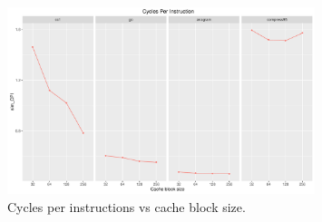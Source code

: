 \documentclass[10pt]{scrartcl}
\begin{document}
\begin{figure}[h]
  \centering
  \includegraphics[width=0.8\textwidth]{Plots/plot_CacheBS_sim_CPI}
  \caption{Cycles per instructions vs cache block size.}\label{fig:cache-bs_sim_cpi}
\end{figure}
\end{document}
